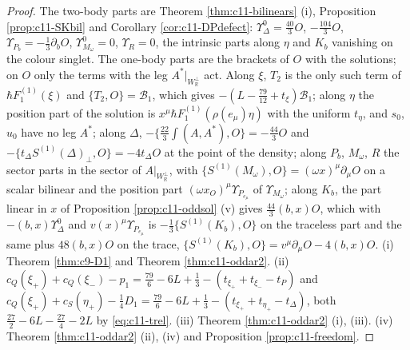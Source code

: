 \begin{proof}
The two-body parts are Theorem \ref{thm:c11-bilinears} (i), Proposition \ref{prop:c11-SKbil} and Corollary \ref{cor:c11-DPdefect}: $\Upsilon^0_\Delta=\tfrac{40}3O$, $-\tfrac{104}3O$, $\Upsilon_{P_b}=-\tfrac13\partial_bO$, $\Upsilon^0_{M_\omega}=0$, $\Upsilon_R=0$, the intrinsic parts along $\eta$ and $K_b$ vanishing on the colour singlet. The one-body parts are the brackets of $O$ with the solutions; on $O$ only the terms with the leg $A^*|_{W_{\mathbb R}^\perp}$ act. Along $\xi$, $T_2$ is the only such term of $\hbar F_1^{(1)}(\xi)$ and $\{T_2,O\}=\mathcal B_1$, which gives $-(L-\tfrac{79}{12}+t_\xi)\mathcal B_1$; along $\eta$ the position part of the solution is $x^\mu\hbar F_1^{(1)}(\rho(e_\mu)\eta)$ with the uniform $t_\eta$, and $s_0$, $u_0$ have no leg $A^*$; along $\Delta$, $-\{\tfrac{22}3\int(A,A^*),O\}=-\tfrac{44}3O$ and $-\{t_\Delta S^{(1)}(\Delta)_\perp,O\}=-4t_\Delta O$ at the point of the density; along $P_b$, $M_\omega$, $R$ the sector parts in the sector of $A|_{W_{\mathbb R}^\perp}$, with $\{S^{(1)}(M_\omega),O\}=(\omega x)^\mu\partial_\mu O$ on a scalar bilinear and the position part $(\omega x_O)^\mu\Upsilon_{P_{e_\mu}}$ of $\Upsilon_{M_\omega}$; along $K_b$, the part linear in $x$ of Proposition \ref{prop:c11-oddsol} (v) gives $\tfrac{44}3(b,x)O$, which with $-(b,x)\Upsilon^0_\Delta$ and $v(x)^\mu\Upsilon_{P_{e_\mu}}$ is $-\tfrac13\{S^{(1)}(K_b),O\}$ on the traceless part and the same plus $48(b,x)O$ on the trace, $\{S^{(1)}(K_b),O\}=v^\mu\partial_\mu O-4(b,x)O$. (i) Theorem \ref{thm:c9-D1} and Theorem \ref{thm:c11-oddar2}. (ii) $c_Q(\xi_+)+c_Q(\xi_-)-p_1=\tfrac{79}6-6L+\tfrac13-(t_{\xi_+}+t_{\xi_-}-t_P)$ and $c_Q(\xi_+)+c_S(\eta_+)-\tfrac14D_1=\tfrac{79}6-6L+\tfrac13-(t_{\xi_+}+t_{\eta_+}-t_\Delta)$, both $\tfrac{27}2-6L-\tfrac{27}4-2L$ by \eqref{eq:c11-trel}. (iii) Theorem \ref{thm:c11-oddar2} (i), (iii). (iv) Theorem \ref{thm:c11-oddar2} (ii), (iv) and Proposition \ref{prop:c11-freedom}.
\end{proof}

